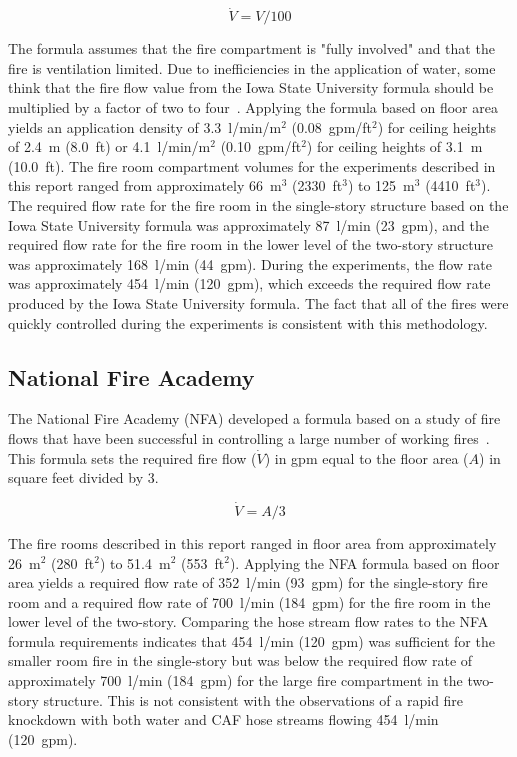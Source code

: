\documentclass[12pt,oneside]{book}
\begin{document}
\begin{equation}\label{eq:isu_form}
\dot{V} = V / 100
\end{equation}

The formula assumes that the fire compartment is "fully involved" and that the fire is ventilation limited.  Due to inefficiencies in the application of water, some think that the fire flow value from the Iowa State University formula should be multiplied by a factor of two to four~\cite{NFPA}. Applying the formula based on floor area yields an application density of 3.3~l/min/m$^2$ (0.08~gpm/ft$^2$) for ceiling heights of 2.4~m (8.0~ft) or 4.1~l/min/m$^2$ (0.10~gpm/ft$^2$) for ceiling heights of 3.1~m (10.0~ft). The fire room compartment volumes for the experiments described in this report ranged from approximately 66~m$^3$ (2330~ft$^3$) to 125~m$^3$ (4410~ft$^3$). The required flow rate for the fire room in the single-story structure based on the Iowa State University formula was approximately 87~l/min (23~gpm), and the required flow rate for the fire room in the lower level of the two-story structure was approximately 168~l/min (44~gpm). During the experiments, the flow rate was approximately 454~l/min (120~gpm), which exceeds the required flow rate produced by the Iowa State University formula. The fact that all of the fires were quickly controlled during the experiments is consistent with this methodology. 

\subsection{National Fire Academy}
The National Fire Academy (NFA) developed a formula based on a study of fire flows that have been successful in controlling a large number of working fires~\cite{Klaene:1}. This formula sets the required fire flow ($\dot{V}$) in gpm equal to the floor area ($A$) in square feet divided by 3.

\begin{equation}\label{eq:nfa_form}
\dot{V} = A / 3
\end{equation}

The fire rooms described in this report ranged in floor area from approximately 26~m$^2$ (280~ft$^2$) to 51.4~m$^2$ (553~ft$^2$). Applying the NFA formula based on floor area yields a required flow rate of 352~l/min (93~gpm) for the single-story fire room and a required flow rate of 700~l/min (184~gpm) for the fire room in the lower level of the two-story. Comparing the hose stream flow rates to the NFA formula requirements indicates that 454~l/min (120~gpm) was sufficient for the smaller room fire in the single-story but was below the required flow rate of approximately 700~l/min (184~gpm) for the large fire compartment in the two-story structure. This is not consistent with the observations of a rapid fire knockdown with both water and CAF hose streams flowing 454~l/min (120~gpm). 
\end{document}
